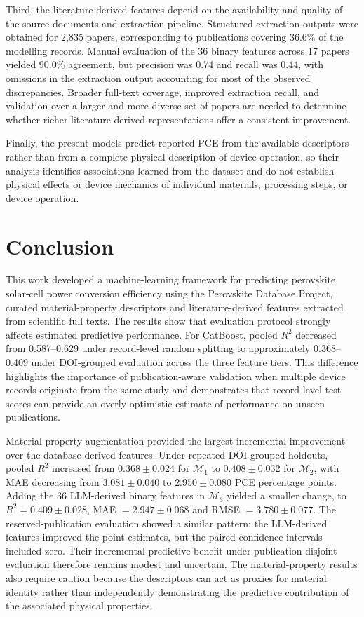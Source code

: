\documentclass[3p]{elsarticle}
\begin{document}
Third, the literature-derived features depend on the availability and quality of the source documents and extraction pipeline. Structured extraction outputs were obtained for 2,835 papers, corresponding to publications covering 36.6\% of the modelling records. Manual evaluation of the 36 binary features across 17 papers yielded 90.0\% agreement, but precision was 0.74 and recall was 0.44, with omissions in the extraction output accounting for most of the observed discrepancies. Broader full-text coverage, improved extraction recall, and validation over a larger and more diverse set of papers are needed to determine whether richer literature-derived representations offer a consistent improvement.

Finally, the present models predict reported PCE from the available descriptors rather than from a complete physical description of device operation, so their analysis identifies associations learned from the dataset and do not establish physical effects or device mechanics of individual materials, processing steps, or device operation.

\section{Conclusion}
\label{sec:conclusion}

This work developed a machine-learning framework for predicting perovskite solar-cell power conversion efficiency using the Perovskite Database Project, curated material-property descriptors and literature-derived features extracted from scientific full texts. The results show that evaluation protocol strongly affects estimated predictive performance. For CatBoost, pooled $R^2$ decreased from 0.587--0.629 under record-level random splitting to approximately 0.368--0.409 under DOI-grouped evaluation across the three feature tiers. This difference highlights the importance of publication-aware validation when multiple device records originate from the same study and demonstrates that record-level test scores can provide an overly optimistic estimate of performance on unseen publications.

Material-property augmentation provided the largest incremental improvement over the database-derived features. Under repeated DOI-grouped holdouts, pooled $R^2$ increased from $0.368\pm0.024$ for $\mathcal{M}_1$ to $0.408\pm0.032$ for $\mathcal{M}_2$, with MAE decreasing from $3.081\pm0.040$ to $2.950\pm0.080$ PCE percentage points. Adding the 36 LLM-derived binary features in $\mathcal{M}_3$ yielded a smaller change, to $R^2=0.409\pm0.028$, MAE $=2.947\pm0.068$ and RMSE $=3.780\pm0.077$. The reserved-publication evaluation showed a similar pattern: the LLM-derived features improved the point estimates, but the paired confidence intervals included zero. Their incremental predictive benefit under publication-disjoint evaluation therefore remains modest and uncertain. The material-property results also require caution because the descriptors can act as proxies for material identity rather than independently demonstrating the predictive contribution of the associated physical properties.
\end{document}
